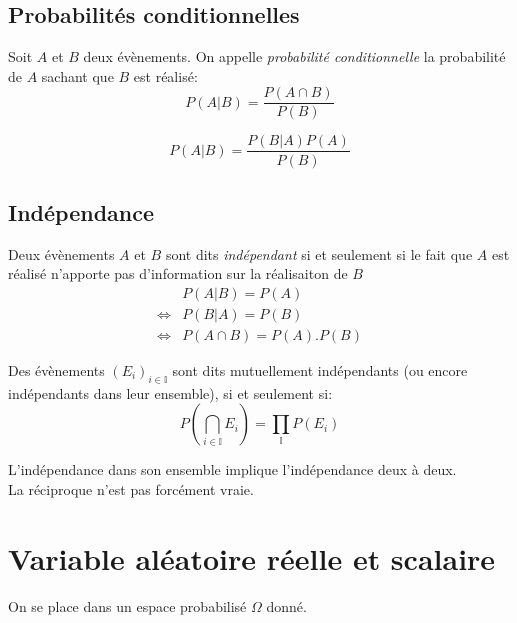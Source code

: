 \documentclass[main.tex]{subfiles}
\begin{document}
\subsection{Probabilités conditionnelles}

\begin{defin}
  Soit $A$ et $B$ deux évènements.  On appelle \emph{probabilité conditionnelle} la probabilité de $A$ sachant que  $B$ est réalisé:
  \[
    P(A|B) = \frac{P(A\cap B)}{P(B)}
  \]
\end{defin}
\begin{prop}
  \[
    P(A|B) = \frac{P(B|A)P(A)}{P(B)}
  \]
\end{prop}

\subsection{Indépendance}
\begin{defin}
  Deux évènements $A$ et $B$ sont dits \emph{indépendant} si et seulement si le fait que $A$ est réalisé n'apporte pas d'information sur la réalisaiton de $B$
    \begin{align*}
      & P(A|B) = P(A)\\
      \iff & P(B|A) = P(B)\\
      \iff & P(A\cap B) = P(A) .P(B)
    \end{align*}
\end{defin}
\begin{defin}
  Des évènements $(E_i)_{i\in\mathbb{I}}$  sont dits mutuellement indépendants (ou encore indépendants dans leur ensemble), si et seulement si:
  \[
  P\left(\displaystyle\bigcap_{i\in\mathbb{I}}E_i\right) = \displaystyle\prod_{\mathbb{I}} P(E_i)
\]
\end{defin}

\begin{prop}
  L'indépendance dans son ensemble implique l'indépendance deux à deux. \\
  La réciproque n'est pas forcément vraie.
\end{prop}
\section{Variable aléatoire réelle et scalaire}
On se place dans un espace probabilisé $\Omega$ donné.
\end{document}
